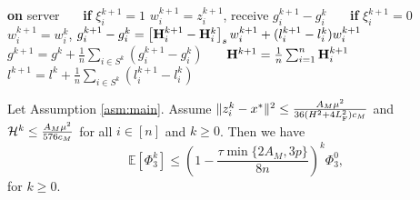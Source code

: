 \documentclass[11pt]{article}
\begin{document}
\begin{algorithm}[h!]
\begin{algorithmic}[1]
			\STATE \textbf{on} server
			\STATE ~~~{\color{blue}\textbf{if} $\xi_i^{k+1}=1$ }
			\STATE \quad \quad $w_i^{k+1} = z_i^{k+1}$, receive $g_i^{k+1}-g_i^k$
			\STATE ~~~{\color{blue}\textbf{if} $\xi_i^{k+1}=0$ } 
			\STATE \quad \quad $w_i^{k+1} = w_i^k$, $g_i^{k+1}-g_i^k = \left[ \mathbf{H}_i^{k+1} - \mathbf{H}_i^k \right]_s w_i^{k+1} +  (l_i^{k+1} - l_i^k) w_i^{k+1}$ 
			\STATE ~~~$g^{k+1} = g^k + \tfrac{1}{n}\sum_{i\in S^k} \left(  g_i^{k+1} - g_i^k  \right)$  
			\STATE ~~~$\mathbf{H}^{k+1} = \frac{1}{n} \sum_{i=1}^n \mathbf{H}_i^{k+1}$
			\STATE ~~~$l^{k+1} = l^k + \tfrac{1}{n}\sum_{i\in S^k} \left(  l_i^{k+1} - l_i^k  \right)$ 
		\end{algorithmic}
	\end{algorithm}
	
	
	
	
	
	
	
	
	\begin{theorem}\label{th:3PcBL2}
		Let Assumption \ref{asm:main}. Assume $\|z_i^k-x^*\|^2 \leq \frac{A_M \mu^2}{36(H^2 + 4L_{\rm F}^2)c_M}$ and ${\cal H}^k \leq \frac{A_M\mu^2}{576c_M}$ for all $i\in [n]$ and $k\geq 0$. Then we have 
		$$
		\mathbb{E}[\Phi_3^k] \leq \left(  1 - \frac{\tau \min\{  2A_M, 3p  \} }{8n}  \right) ^k \Phi_3^0, 
		$$
		for $k\geq 0$. 
	\end{theorem}
	
\end{document}
